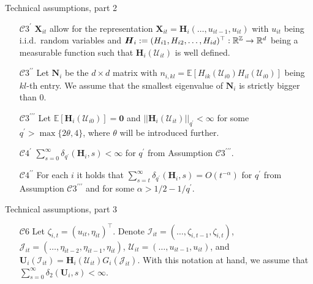 \documentclass[10pt, handout]{beamer}
\newcommand{\E}{\mathbb{E}}
\newcommand{\reals}{\mathbb{R}}
\newcommand{\X}{\boldsymbol{X}}
\begin{document}
\begin{frame}[label=tech_assumptions_2]{Technical assumptions, part 2}
\begin{enumerate}

\item[$\mathcal{C}3^\prime$] $ \X_{it}$ allow for the representation $ \X_{it} = \boldsymbol{H}_i(\ldots,u_{it-1},u_{it})$ with $u_{it}$ being i.i.d.\ random variables and $\boldsymbol{H}_i := (H_{i1}, H_{i2}, \ldots, H_{id})^\top:\linebreak \mathbb{R}^\mathbb{Z} \rightarrow \reals^d$ being a measurable function such that $\boldsymbol{H}_i(\mathcal{U}_{it})$ is well defined.

\item[$\mathcal{C}3^{\prime\prime}$] Let $\boldsymbol{N}_i$ be the $d\times d$ matrix with $n_{i, kl}= \E[H_{ik}(\mathcal{U}_{i0})H_{il}(\mathcal{U}_{i0})]$ being $kl$-th entry. We assume that the smallest eigenvalue of $\boldsymbol{N}_i$ is strictly bigger than $0$.

\item[$\mathcal{C}3^{\prime\prime\prime}$]  Let $\E [\boldsymbol{H}_{i}(\mathcal{U}_{i0})]=\mathbf{0}$ and $||\boldsymbol{H}_{i}(\mathcal{U}_{it})||_{q^\prime} <\infty$ for some $q^\prime > \max\{ 2\theta, 4\}$, where $\theta$ will be introduced further.
\item[$\mathcal{C}4^\prime$] $\sum_{s=0}^\infty \delta_{q^\prime}(\boldsymbol{H}_i, s)<\infty$ for $q^\prime$ from Assumption $\mathcal{C}3^{\prime\prime\prime}$.
\item[$\mathcal{C}4^{\prime\prime}$] For each $i$ it holds that $\sum_{s=t}^{\infty} \delta_{q^\prime}(\boldsymbol{H}_{i}, s)= O(t^{-\alpha}) $ for $q^\prime$ from Assumption $\mathcal{C}3^{\prime\prime\prime}$ and for some $\alpha > 1/2 - 1/{q^\prime}$. \hyperlink{frame_assumptions<5>}{}

\end{enumerate}
\end{frame}

\begin{frame}[label=tech_assumptions_3]{Technical assumptions, part 3}
\begin{enumerate}

\item[$\mathcal{C}6$] Let $\zeta_{i, t} = (u_{it}, \eta_{it})^\top$. Denote $\mathcal{I}_{it} = (\ldots, \zeta_{i, t-1}, \zeta_{i, t})$, $\mathcal{J}_{it} = (\ldots,\eta_{it-2},\eta_{it-1},\eta_{it})$, $\mathcal{U}_{it} = (\ldots, u_{it-1}, u_{it})$, and $\mathbf{U}_i(\mathcal{I}_{it}) =  \boldsymbol{H}_i(\mathcal{U}_{it})G_i(\mathcal{J}_{it})$. With this notation at hand, we assume that $\sum_{s=0}^\infty \delta_2(\mathbf{U}_i, s)<\infty$.\hyperlink{frame_assumptions<6>}{}
\end{enumerate}
\end{frame}
\end{document}
